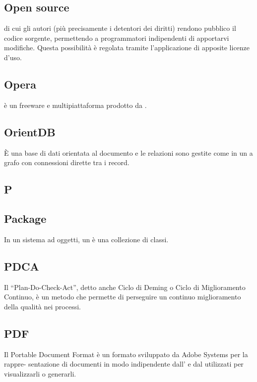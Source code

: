 \subsection*{Open source}
 di cui gli autori (più precisamente i detentori dei diritti) rendono pubblico
il codice sorgente, permettendo a programmatori indipendenti di apportarvi modifiche.
Questa possibilità è regolata tramite l'applicazione di apposite licenze d'uso.

\subsection*{Opera}
 è un   freeware e multipiattaforma prodotto da  .

\subsection*{OrientDB}
È una base di dati orientata al documento e le relazioni sono gestite come in un  a grafo con connessioni dirette tra i record.

\newpage

\begin{center}
\Huge\section*{\uppercase{P}}
\end{center}

\subsection*{Package}
In un sistema ad oggetti, un  è una collezione di classi.

\subsection*{PDCA}
Il “Plan-Do-Check-Act”, detto anche Ciclo di Deming o Ciclo di Miglioramento Continuo,
è un metodo che permette di perseguire un continuo miglioramento della qualità nei processi.

\subsection*{PDF}
Il Portable Document Format è un formato sviluppato da Adobe Systems per la rappre-
sentazione di documenti in modo indipendente dall’ e dal  utilizzati per
visualizzarli o generarli.

